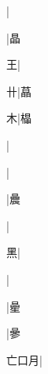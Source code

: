 \begin{multicols}{2}
{{\cjk{}{\cnsym{}　}{\cnsym{}　}{\cnsym{}　}}|{}\par
\null\par
{\cjk{}{\cnsym{}　}{\cnsym{}　}{\cnsym{}　}}\mktsJzrVerticalBar{}{\cjk{}{\cnsym{}　}{\cnsym{}　}{\cnsym{}　}}|{\cjk{}晶}\par
{\cjk{}{\cnsym{}　}{\cnsym{}　}王}\mktsJzrVerticalBar{}{\cjk{}{\cnsym{}　}{\cnsym{}　}{\cnsym{}　}}|{}\par
{\cjk{}{\cnsym{}　}{\cnsym{}　}卄}\mktsJzrVerticalBar{}{\cjk{}{\cnsym{}　}{\cnsym{}　}{\cnsym{}　}}|{\cjk{}蕌}\par
{\cjk{}{\cnsym{}　}{\cnsym{}　}木}\mktsJzrVerticalBar{}{\cjk{}{\cnsym{}　}{\cnsym{}　}{\cnsym{}　}}|{\cjk{}橸}\par
{}\mktsJzrVerticalBar{}{\cjk{}{\cnsym{}　}{\cnsym{}　}{\cnsym{}　}}|{}\par
{}\mktsJzrVerticalBar{}{\cjk{}{\cnsym{}　}{\cnsym{}　}{\cnsym{}　}}|{}\par
{\cjk{}{\cnsym{}　}{\cnsym{}　}{\cnsym{}　}}|{\cjk{}曟}\par
{\cjk{}{\cnsym{}　}{\cnsym{}　}{\cnsym{}　}}|{}\par
{\cjk{}{\cnsym{}　}{\cnsym{}　}黑}|{}\par
{\cjk{}{\cnsym{}　}{\cnsym{}　}{\cnsym{}　}}|{}\par
{\cjk{}{\cnsym{}　}{\cnsym{}　}{\cnsym{}　}}|{\cjk{}曐}\par
{\cjk{}{\cnsym{}　}{\cnsym{}　}{\cnsym{}　}}|{\cjk{}曑}\par
{\cjk{}亡口月}|{}\par
}
\end{multicols}
